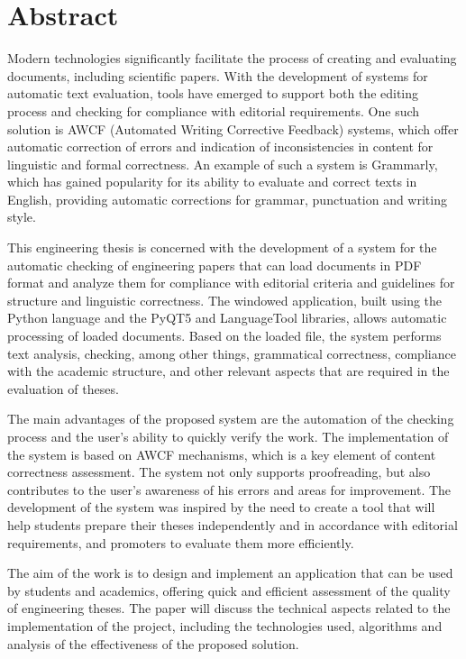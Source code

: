 \chapter*{Abstract}


\justifying

Modern technologies significantly facilitate the process of creating and evaluating documents, including scientific papers. With the development of systems for automatic text evaluation, tools have emerged to support both the editing process and checking for compliance with editorial requirements. One such solution is AWCF (Automated Writing Corrective Feedback) systems, which offer automatic correction of errors and indication of inconsistencies in content for linguistic and formal correctness. An example of such a system is Grammarly, which has gained popularity for its ability to evaluate and correct texts in English, providing automatic corrections for grammar, punctuation and writing style.

This engineering thesis is concerned with the development of a system for the automatic checking of engineering papers that can load documents in PDF format and analyze them for compliance with editorial criteria and guidelines for structure and linguistic correctness. The windowed application, built using the Python language and the PyQT5 and LanguageTool libraries, allows automatic processing of loaded documents. Based on the loaded file, the system performs text analysis, checking, among other things, grammatical correctness, compliance with the academic structure, and other relevant aspects that are required in the evaluation of theses.

The main advantages of the proposed system are the automation of the checking process and the user's ability to quickly verify the work. The implementation of the system is based on AWCF mechanisms, which is a key element of content correctness assessment. The system not only supports proofreading, but also contributes to the user's awareness of his errors and areas for improvement. The development of the system was inspired by the need to create a tool that will help students prepare their theses independently and in accordance with editorial requirements, and promoters to evaluate them more efficiently.

The aim of the work is to design and implement an application that can be used by students and academics, offering quick and efficient assessment of the quality of engineering theses. The paper will discuss the technical aspects related to the implementation of the project, including the technologies used, algorithms and analysis of the effectiveness of the proposed solution.

